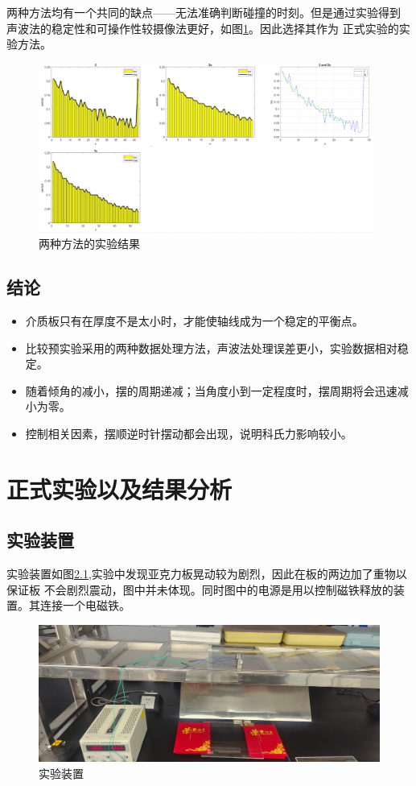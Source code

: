 \documentclass[AutoFakeBold]{LZUThesis}
\begin{document}
两种方法均有一个共同的缺点——无法准确判断碰撞的时刻。但是通过实验得到
声波法的稳定性和可操作性较摄像法更好，如图\ref{data_ways}。因此选择其作为
正式实验的实验方法。

\begin{figure}[H]
    \centering
    \includegraphics[width=11cm]{figures/data_ways.png}
    \caption{两种方法的实验结果}
    \label{data_ways}
\end{figure}

\section{结论}

\begin{itemize}
    \item 介质板只有在厚度不是太小时，才能使轴线成为一个稳定的平衡点。 

    \item 比较预实验采用的两种数据处理方法，声波法处理误差更小，实验数据相对稳定。 

    \item 随着倾角的减小，摆的周期递减；当角度小到一定程度时，摆周期将会迅速减小为零。

    \item 控制相关因素，摆顺逆时针摆动都会出现，说明科氏力影响较小。 
\end{itemize}



\chapter{正式实验以及结果分析}
\section{实验装置}
实验装置如图\ref{equ},实验中发现亚克力板晃动较为剧烈，因此在板的两边加了重物以保证板
不会剧烈震动，图中并未体现。同时图中的电源是用以控制磁铁释放的装置。其连接一个电磁铁。
\begin{figure}[H]
    \centering
    \includegraphics[width=12cm]{figures/eq.png}
    \caption{实验装置}
    \label{equ}
\end{figure}
\end{document}
